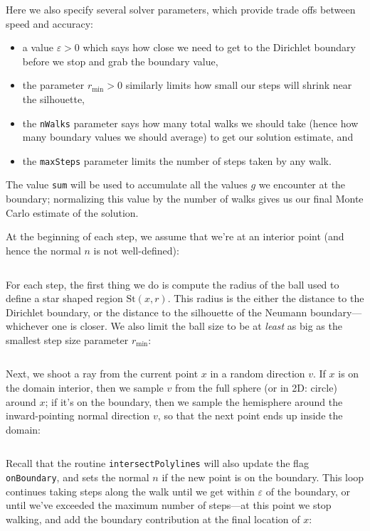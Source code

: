 \documentclass{article}
\newcommand{\code}[1]{\texttt{#1}}
\newcommand{\St}{\text{St}}
\renewcommand{\vec}[1]{#1}
\begin{document}
Here we also specify several solver parameters, which provide trade offs between speed and accuracy:
\begin{itemize}
   \item a value \(\varepsilon > 0\) which says how close we need to get to the Dirichlet boundary before we stop and grab the boundary value,
   \item the parameter \(r_{\min} > 0\) similarly limits how small our steps will shrink near the silhouette,
   \item the \code{nWalks} parameter says how many total walks we should take (hence how many boundary values we should average) to get our solution estimate, and
   \item the \code{maxSteps} parameter limits the number of steps taken by any walk.
\end{itemize}
The value \code{sum} will be used to accumulate all the values \(g\) we encounter at the boundary; normalizing this value by the number of walks gives us our final Monte Carlo estimate of the solution.  

At the beginning of each step, we assume that we're at an interior point (and hence the normal \(n\) is not well-defined):

\inputminted[fontsize=\small,linenos,firstline=128,lastline=131,bgcolor=bg]{cpp}{../code/WoStLaplace2D.cpp}

For each step, the first thing we do is compute the radius of the ball used to define a star shaped region \(\St(\vec{x},r)\).  This radius is the either the distance to the Dirichlet boundary, or the distance to the silhouette of the Neumann boundary---whichever one is closer.  We also limit the ball size to be at \emph{least} as big as the smallest step size parameter \(r_{\min}\):

\inputminted[fontsize=\small,linenos,firstline=133,lastline=140,bgcolor=bg]{cpp}{../code/WoStLaplace2D.cpp}

Next, we shoot a ray from the current point \(x\) in a random direction \(v\).  If \(x\) is on the domain interior, then we sample \(v\) from the full sphere (or in 2D: circle) around \(x\); if it's on the boundary, then we sample the hemisphere around the inward-pointing normal direction \(v\), so that the next point ends up inside the domain:

\inputminted[fontsize=\small,linenos,firstline=142,lastline=148,bgcolor=bg]{cpp}{../code/WoStLaplace2D.cpp}

Recall that the routine \code{intersectPolylines} will also update the flag \code{onBoundary}, and sets the normal \(\vec{n}\) if the new point is on the boundary.  This loop continues taking steps along the walk until we get within \(\varepsilon\) of the boundary, or until we've exceeded the maximum number of steps---at this point we stop walking, and add the boundary contribution at the final location of \(\vec{x}\):
\end{document}
